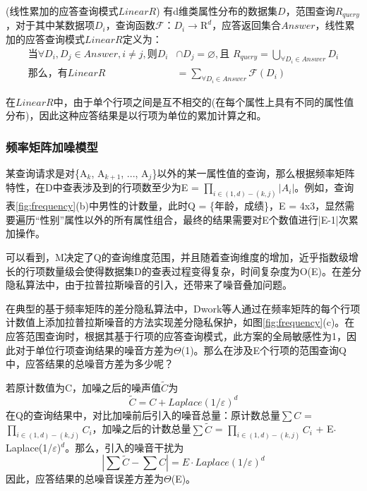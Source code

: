 \begin{defn}
	(\textsc{线性累加的应答查询模式$LinearR$}) 有d维类属性分布的数据集$D$，范围查询$R_{query}$，对于其中某数据项$D_{i}$，查询函数$\mathcal{F}$：$D_{i} \rightarrow \mathrm{R}^d$，应答返回集合$Answer$，线性累加的应答查询模式$LinearR$定义为：
	\begin{equation*}
	\label{eq:linear_response}
		\begin{split}
			\text{当}\forall D_{i},D_{j} \in Answer, i \neq j, \text{则} D_{i} &\cap D_{j} = \varnothing,\text{且 }
			R_{query} = \bigcup\limits_{\forall D_{i} \in Answer} D_{i}\\
			\text{那么，有}LinearR &= \sum\limits_{\forall D_{i} \in Answer} \mathcal{F}(D_{i})
		\end{split}
	\end{equation*}
\end{defn}

在$LinearR$中，由于单个行项之间是互不相交的(在每个属性上具有不同的属性值分布)，因此这种应答结果是以行项为单位的累加计算之和。

\subsubsection{频率矩阵加噪模型}

某查询请求是对\{A$_{k}$, A$_{k+1}$, ..., A$_{j}$\}以外的某一属性值的查询，那么根据频率矩阵特性，在D中查表涉及到的行项数至少为E = \(\prod\nolimits_{i \in (1,d) - (k,j)} {|A{_i} |} \)。例如，查询表\ref{fig:frequency}(b)中男性的计数量，此时Q = \{年龄，成绩\}，E = 4x3，显然需要遍历“性别”属性以外的所有属性组合，最终的结果需要对E个数值进行|E-1|次累加操作。

可以看到，M决定了Q的查询维度范围，并且随着查询维度的增加，近乎指数级增长的行项数量级会使得数据集D的查表过程变得复杂，时间复杂度为O(E)。在差分隐私算法中，由于拉普拉斯噪音的引入，还带来了噪音叠加问题。

在典型的基于频率矩阵的差分隐私算法中\cite{Dwork Calibrating}，Dwork等人通过在频率矩阵的每个行项计数值上添加拉普拉斯噪音的方法实现差分隐私保护，如图\ref{fig:frequency}(c)。在应答范围查询时，根据其基于行项的应答查询模式，此方案的全局敏感性为1，因此对于单位行项查询结果的噪音方差为$\Theta$(1)。那么在涉及E个行项的范围查询Q中，应答结果的总噪音方差为多少呢？

若原计数值为C，加噪之后的噪声值$\tilde{C}$为
\[
\tilde{C} = C + Laplace(1/\varepsilon)^d
\]
在Q的查询结果中，对比加噪前后引入的噪音总量：原计数总量$\sum{C}$ = \(\prod\nolimits_{i \in (1,d) - (k,j)} {C{_i}} \)，加噪之后的计数总量$\sum{\tilde{C}}$ = \(\prod\nolimits_{i \in (1,d) - (k,j)} {C{_i}} \) + E$\cdotp$Laplace(1/$\varepsilon$)$^d$。那么，引入的噪音干扰为
\[
|\sum{\tilde{C}} - \sum{C}| = E \cdotp Laplace(1/\varepsilon)^d
\]
因此，应答结果的总噪音误差方差为$\Theta$(E)。

